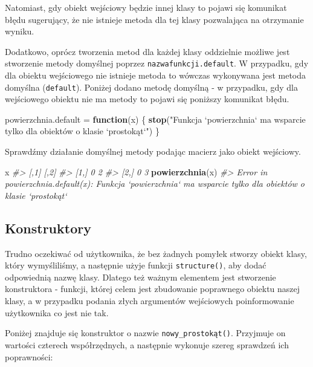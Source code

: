 \documentclass[paper=6in:9in,pagesize=pdftex,headinclude=on,footinclude=on,10pt]{scrbook}
\newenvironment{Shaded}{\begin{snugshade}}{\end{snugshade}}
\newcommand{\CommentTok}[1]{\textcolor[rgb]{0.56,0.35,0.01}{\textit{#1}}}
\newcommand{\ControlFlowTok}[1]{\textcolor[rgb]{0.13,0.29,0.53}{\textbf{#1}}}
\newcommand{\KeywordTok}[1]{\textcolor[rgb]{0.13,0.29,0.53}{\textbf{#1}}}
\newcommand{\NormalTok}[1]{#1}
\newcommand{\StringTok}[1]{\textcolor[rgb]{0.31,0.60,0.02}{#1}}
\begin{document}
Natomiast, gdy obiekt wejściowy będzie innej klasy to pojawi się komunikat błędu sugerujący, że nie istnieje metoda dla tej klasy pozwalająca na otrzymanie wyniku.

Dodatkowo, oprócz tworzenia metod dla każdej klasy oddzielnie możliwe jest stworzenie metody domyślnej poprzez \texttt{nazwafunkcji.default}.
W przypadku, gdy dla obiektu wejściowego nie istnieje metoda to wówczas wykonywana jest metoda domyślna (\texttt{default}).
Poniżej dodano metodę domyślną - w przypadku, gdy dla wejściowego obiektu nie ma metody to pojawi się poniższy komunikat błędu.

\begin{Shaded}
\begin{Highlighting}[]
\NormalTok{powierzchnia.default =}\StringTok{ }\ControlFlowTok{function}\NormalTok{(x) \{}
  \KeywordTok{stop}\NormalTok{(}\StringTok{"Funkcja `powierzchnia` ma wsparcie tylko dla obiektów o klasie `prostokąt`"}\NormalTok{)}
\NormalTok{\}}
\end{Highlighting}
\end{Shaded}

Sprawdźmy działanie domyślnej metody podając macierz jako obiekt wejściowy.

\begin{Shaded}
\begin{Highlighting}[]
\NormalTok{x}
\CommentTok{#>      [,1] [,2]}
\CommentTok{#> [1,]    0    2}
\CommentTok{#> [2,]    0    3}
\KeywordTok{powierzchnia}\NormalTok{(x)}
\CommentTok{#> Error in powierzchnia.default(x): Funkcja `powierzchnia` ma wsparcie tylko dla obiektów o klasie `prostokąt`}
\end{Highlighting}
\end{Shaded}

\hypertarget{konstruktory}{%
\subsection{Konstruktory}\label{konstruktory}}

Trudno oczekiwać od użytkownika, że bez żadnych pomyłek stworzy obiekt klasy, który wymyśliliśmy, a następnie użyje funkcji \texttt{structure()}, aby dodać odpowiednią nazwę klasy.
Dlatego też ważnym elementem jest stworzenie konstruktora - funkcji, której celem jest zbudowanie poprawnego obiektu naszej klasy, a w przypadku podania złych argumentów wejściowych poinformowanie użytkownika co jest nie tak.

Poniżej znajduje się konstruktor o nazwie \texttt{nowy\_prostokąt()}. Przyjmuje on wartości czterech współrzędnych, a następnie wykonuje szereg sprawdzeń ich poprawności:
\end{document}

